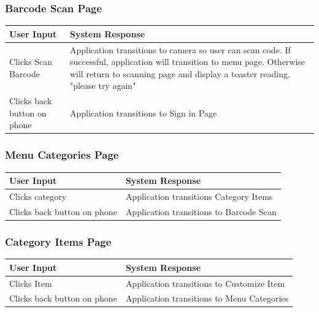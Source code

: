 \documentclass[12pt, titlepage]{article}
\begin{document}
\subsubsection{Barcode Scan Page}
\begin{center}
    \begin{tabular}{ | l | p{10cm} |}
    \hline
    User Input & System Response \\ \hline
    Clicks Scan Barcode & Application transitions to camera so user can scan code. If successful, application will transition to menu page. Otherwise will return to scanning page and display a toaster reading, "please try again" \\ \hline
    Clicks back button on phone & Application transitions to Sign in Page \\
    \hline
    \end{tabular}
\end{center}

\subsubsection{Menu Categories Page}
\begin{center}
    \begin{tabular}{ | l | p{10cm} |}
    \hline
    User Input & System Response \\ \hline
    Clicks category & Application transitions Category Items \\ \hline
    Clicks back button on phone & Application transitions to Barcode Scan \\
    \hline
    \end{tabular}
\end{center}

\subsubsection{Category Items Page}
\begin{center}
    \begin{tabular}{ | l | p{10cm} |}
    \hline
    User Input & System Response \\ \hline
    Clicks Item & Application transitions to Customize Item \\ \hline
    Clicks back button on phone & Application transitions to Menu Categories \\
    \hline
    \end{tabular}
\end{center}
\end{document}
